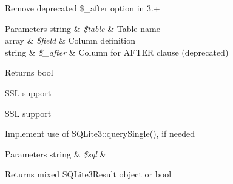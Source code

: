 
\begin{DoxyRefList}
\item[\label{todo__todo000003}%
\hypertarget{todo__todo000003}{}%
Global \hyperlink{class_c_i___d_b__forge_a855261dcf98c0cf401aa469994919c51}{C\+I\+\_\+\+D\+B\+\_\+forge\+:\+:add\+\_\+column} (\$table, \$field, \$\+\_\+after=N\+U\+L\+L)]Remove deprecated \$\+\_\+after option in 3.+ 
\begin{DoxyParams}[1]{Parameters}
string & {\em \$table} & Table name \\
\hline
array & {\em \$field} & Column definition \\
\hline
string & {\em \$\+\_\+after} & Column for A\+F\+T\+E\+R clause (deprecated) \\
\hline
\end{DoxyParams}
\begin{DoxyReturn}{Returns}
bool  
\end{DoxyReturn}

\item[\label{todo__todo000004}%
\hypertarget{todo__todo000004}{}%
Global \hyperlink{class_c_i___d_b__mysqli__driver_a52bf595e79e96cc0a7c907a9b45aeb4d}{C\+I\+\_\+\+D\+B\+\_\+mysqli\+\_\+driver\+:\+:db\+\_\+connect} (\$persistent=F\+A\+L\+S\+E)]S\+S\+L support  
\item[\label{todo__todo000005}%
\hypertarget{todo__todo000005}{}%
Global \hyperlink{class_c_i___d_b__pdo__mysql__driver_a52bf595e79e96cc0a7c907a9b45aeb4d}{C\+I\+\_\+\+D\+B\+\_\+pdo\+\_\+mysql\+\_\+driver\+:\+:db\+\_\+connect} (\$persistent=F\+A\+L\+S\+E)]S\+S\+L support  
\item[\label{todo__todo000007}%
\hypertarget{todo__todo000007}{}%
Global \hyperlink{class_c_i___d_b__sqlite3__driver_a114ab675d89bf8324a41785fb475e86d}{C\+I\+\_\+\+D\+B\+\_\+sqlite3\+\_\+driver\+:\+:\+\_\+execute} (\$sql)]Implement use of S\+Q\+Lite3\+::query\+Single(), if needed 
\begin{DoxyParams}[1]{Parameters}
string & {\em \$sql} & \\
\hline
\end{DoxyParams}
\begin{DoxyReturn}{Returns}
mixed S\+Q\+Lite3\+Result object or bool  
\end{DoxyReturn}


\end{DoxyRefList}

